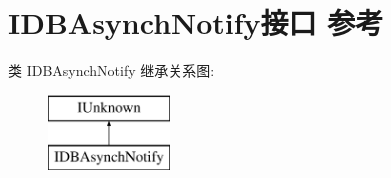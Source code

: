 \hypertarget{interface_i_d_b_asynch_notify}{}\section{I\+D\+B\+Asynch\+Notify接口 参考}
\label{interface_i_d_b_asynch_notify}
类 I\+D\+B\+Asynch\+Notify 继承关系图\+:\begin{figure}[H]
\begin{center}
\leavevmode
\includegraphics[height=2.000000cm]{interface_i_d_b_asynch_notify}
\end{center}
\end{figure}
